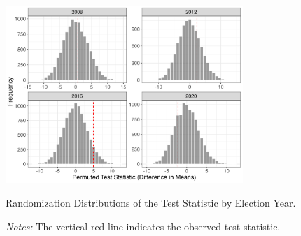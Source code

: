 \documentclass[10pt]{article}
\theoremstyle{sfstyle}
\theoremstyle{remark}
\begin{document}
\begin{figure}[htbp]
  \centering
  \includegraphics[width=0.8\textwidth]{../outputs/figures/randomization_distribution_diff_in_means_varw_plot.png}
  \caption{Randomization Distributions of the Test Statistic by Election Year.}
  \caption*{\textit{Notes:} 
    The vertical red line indicates the observed test statistic. 
  }
  \label{fig:randomization-distribution}
\end{figure}



\end{document}

